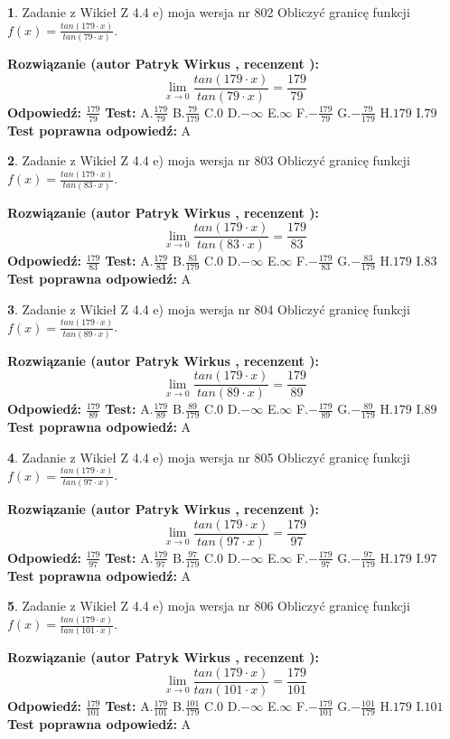 \documentclass[12pt, a4paper]{article}
\theoremstyle{definition} %
\newtheorem{zad}{}
\newcommand{\zadStart}[1]{\begin{zad}#1\newline}
\newcommand{\zadStop}{\end{zad}}
\newcommand{\rozwStart}[2]{\noindent \textbf{Rozwiązanie (autor #1 , recenzent #2): }\newline}
\newcommand{\rozwStop}{\newline}
\newcommand{\odpStart}{\noindent \textbf{Odpowiedź:}\newline}
\newcommand{\odpStop}{\newline}
\newcommand{\testStart}{\noindent \textbf{Test:}\newline}
\newcommand{\testStop}{\newline}
\newcommand{\kluczStart}{\noindent \textbf{Test poprawna odpowiedź:}\newline}
\newcommand{\kluczStop}{\newline}
\begin{document}
\zadStart{Zadanie z Wikieł Z 4.4 e) moja wersja nr 802}
Obliczyć granicę funkcji $f(x)=\frac{tan(179\cdot x)}{tan(79\cdot x)}$.
\zadStop
\rozwStart{Patryk Wirkus}{}
$$\lim\limits_{x\to 0}\frac{tan(179\cdot x)}{tan(79\cdot x)}=
\frac{179}{79}$$
\rozwStop
\odpStart
$\frac{179}{79}$
\odpStop
\testStart
A.$\frac{179}{79}$
B.$\frac{79}{179}$
C.$0$
D.$-\infty$
E.$\infty$
F.$-\frac{179}{79}$
G.$-\frac{79}{179}$
H.$179$
I.$79$
\testStop
\kluczStart
A
\kluczStop



\zadStart{Zadanie z Wikieł Z 4.4 e) moja wersja nr 803}
Obliczyć granicę funkcji $f(x)=\frac{tan(179\cdot x)}{tan(83\cdot x)}$.
\zadStop
\rozwStart{Patryk Wirkus}{}
$$\lim\limits_{x\to 0}\frac{tan(179\cdot x)}{tan(83\cdot x)}=
\frac{179}{83}$$
\rozwStop
\odpStart
$\frac{179}{83}$
\odpStop
\testStart
A.$\frac{179}{83}$
B.$\frac{83}{179}$
C.$0$
D.$-\infty$
E.$\infty$
F.$-\frac{179}{83}$
G.$-\frac{83}{179}$
H.$179$
I.$83$
\testStop
\kluczStart
A
\kluczStop



\zadStart{Zadanie z Wikieł Z 4.4 e) moja wersja nr 804}
Obliczyć granicę funkcji $f(x)=\frac{tan(179\cdot x)}{tan(89\cdot x)}$.
\zadStop
\rozwStart{Patryk Wirkus}{}
$$\lim\limits_{x\to 0}\frac{tan(179\cdot x)}{tan(89\cdot x)}=
\frac{179}{89}$$
\rozwStop
\odpStart
$\frac{179}{89}$
\odpStop
\testStart
A.$\frac{179}{89}$
B.$\frac{89}{179}$
C.$0$
D.$-\infty$
E.$\infty$
F.$-\frac{179}{89}$
G.$-\frac{89}{179}$
H.$179$
I.$89$
\testStop
\kluczStart
A
\kluczStop



\zadStart{Zadanie z Wikieł Z 4.4 e) moja wersja nr 805}
Obliczyć granicę funkcji $f(x)=\frac{tan(179\cdot x)}{tan(97\cdot x)}$.
\zadStop
\rozwStart{Patryk Wirkus}{}
$$\lim\limits_{x\to 0}\frac{tan(179\cdot x)}{tan(97\cdot x)}=
\frac{179}{97}$$
\rozwStop
\odpStart
$\frac{179}{97}$
\odpStop
\testStart
A.$\frac{179}{97}$
B.$\frac{97}{179}$
C.$0$
D.$-\infty$
E.$\infty$
F.$-\frac{179}{97}$
G.$-\frac{97}{179}$
H.$179$
I.$97$
\testStop
\kluczStart
A
\kluczStop



\zadStart{Zadanie z Wikieł Z 4.4 e) moja wersja nr 806}
Obliczyć granicę funkcji $f(x)=\frac{tan(179\cdot x)}{tan(101\cdot x)}$.
\zadStop
\rozwStart{Patryk Wirkus}{}
$$\lim\limits_{x\to 0}\frac{tan(179\cdot x)}{tan(101\cdot x)}=
\frac{179}{101}$$
\rozwStop
\odpStart
$\frac{179}{101}$
\odpStop
\testStart
A.$\frac{179}{101}$
B.$\frac{101}{179}$
C.$0$
D.$-\infty$
E.$\infty$
F.$-\frac{179}{101}$
G.$-\frac{101}{179}$
H.$179$
I.$101$
\testStop
\kluczStart
A
\kluczStop
\end{document}
